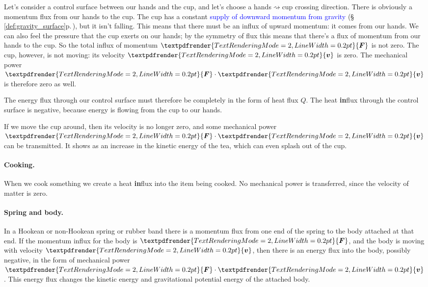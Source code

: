 \documentclass[a4paper,12pt,%
onecolumn,oneside,%
british%
]{memoir}
\providecommand{\href}[2]{#2}
\renewcommand*{\bm}[1]{\textpdfrender{TextRenderingMode=2,LineWidth=0.2pt}{\boldsymbol{#1}}}
\renewcommand*{\|}[1][]{\nonscript\:#1\vert\nonscript\:\mathopen{}}
\newcommand*{\sect}{\S}%
\newcommand*{\furl}[2]{\href{#1}{#2}\pagenote{\url{#1}}}
\renewcommand*{\autoref}[3][\sect\,\ref]{\textcolor{blue}{#3} {\color{blue}\scriptsize(\faIcon[regular]{eye}\;#1{#2}\;p.\,\pageref{#2})}}
\newcommand*{\yv}{\bm{v}}
\newcommand*{\yQ}{Q}%
\newcommand*{\yF}{\bm{F}}
\begin{document}
%
Let's consider a control surface between our hands and the cup, and let's choose a hands${}\rightsquigarrow{}$cup crossing direction.
There is obviously a momentum flux from our hands to the cup. The cup has a constant \autoref{def:gravity_surface}{supply of downward momentum from gravity}, but it isn't falling. This means that there must be an influx of upward momentum: it comes from our hands. We can also feel the pressure that the cup exerts on our hands; by the symmetry of flux this means that there's a flux of momentum from our hands to the cup. So the total influx of momentum $\yF$ is not zero. The cup, however, is not moving: its velocity $\yv$ is zero. The mechanical power $\yF\cdot \yv$ is therefore zero as well.

The energy flux through our control surface must therefore be completely in the form of heat flux $\yQ$. The heat \textbf{in}flux through the control surface is negative, because energy is flowing from the cup to our hands.

If we move the cup around, then its velocity is no longer zero, and some mechanical power $\yF\cdot\yv$ can be transmitted. It shows as an increase in the kinetic energy of the tea, which can even splash out of the cup.

\paragraph{Cooking.}
When we cook something we create a heat \textbf{in}flux into the item being cooked. No mechanical power is transferred, since the velocity of matter is zero.

\paragraph{Spring and body.}
In a Hookean or non-Hookean spring or rubber band there is a momentum flux from one end of the spring to the body attached at that end. If the momentum influx for the body is $\yF$, and the body is moving with velocity $\yv$, then there is an energy flux into the body, possibly negative, in the form of mechanical power $\yF\cdot \yv$. This energy flux changes the kinetic energy and gravitational potential energy of the attached body.
\end{document}
